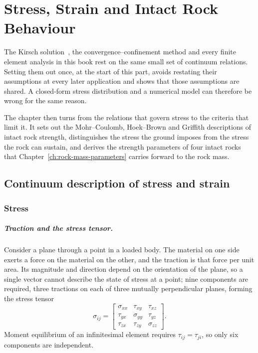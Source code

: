 \chapter{Stress, Strain and Intact Rock Behaviour}
\label{ch:rock-mechanics}

The Kirsch solution~\citep{kirsch1898}, the convergence--confinement method and every finite
element analysis in this book rest on the same small set of continuum
relations. Setting them out once, at the start of this part, avoids restating their
assumptions at every later application and shows that
those assumptions are shared. A closed-form stress distribution and a
numerical model can therefore be wrong for the same reason.

The chapter then turns from the relations that govern stress to the
criteria that limit it. It sets out the Mohr--Coulomb, Hoek--Brown and
Griffith descriptions of intact rock strength, distinguishes the stress the
ground imposes from the stress the rock can sustain, and derives the
strength parameters of four intact rocks that
Chapter~\ref{ch:rock-mass-parameters} carries forward to the rock mass.

\section{Continuum description of stress and strain}
\label{sec:continuum-description-of-stress-and-strain}

\subsection{Stress}
\label{sec:stress}

\paragraph{Traction and the stress tensor.}
Consider a plane through a point in a loaded body. The material on one side
exerts a force on the material on the other, and the traction is that force
per unit area. Its magnitude and direction depend on the orientation of the
plane, so a single vector cannot describe the state of stress at a point;
nine components are required, three tractions on each of three mutually
perpendicular planes, forming the stress tensor
\[
\sigma_{ij} =
\begin{bmatrix}
\sigma_{xx} & \tau_{xy} & \tau_{xz}\\
\tau_{yx} & \sigma_{yy} & \tau_{yz}\\
\tau_{zx} & \tau_{zy} & \sigma_{zz}
\end{bmatrix}.
\]
Moment equilibrium of an infinitesimal element requires
$\tau_{ij} = \tau_{ji}$, so only six components are independent.

